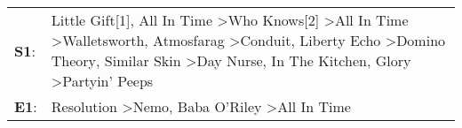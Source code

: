 \begin{supertabular}{p{0.03\textwidth}p{0.92\textwidth}}
 \textbf{S1}:  &  Little Gift[1]\textsuperscript{}, \enspace All In Time\textsuperscript{} \textgreater \enspace Who Knows[2]\textsuperscript{} \textgreater \enspace All In Time\textsuperscript{} \textgreater \enspace Walletsworth\textsuperscript{}, \enspace Atmosfarag\textsuperscript{} \textgreater \enspace Conduit\textsuperscript{}, \enspace Liberty Echo\textsuperscript{} \textgreater \enspace Domino Theory\textsuperscript{}, \enspace Similar Skin\textsuperscript{} \textgreater \enspace Day Nurse\textsuperscript{}, \enspace In The Kitchen\textsuperscript{}, \enspace Glory\textsuperscript{} \textgreater \enspace Partyin' Peeps\textsuperscript{}  \enspace  \\
 \textbf{E1}:  &                                                                                                                                                                                                                                                                                                                                                                                                                                                                                       Resolution\textsuperscript{} \textgreater \enspace Nemo\textsuperscript{}, \enspace Baba O'Riley\textsuperscript{} \textgreater \enspace All In Time\textsuperscript{}  \enspace  \\
\end{supertabular}
